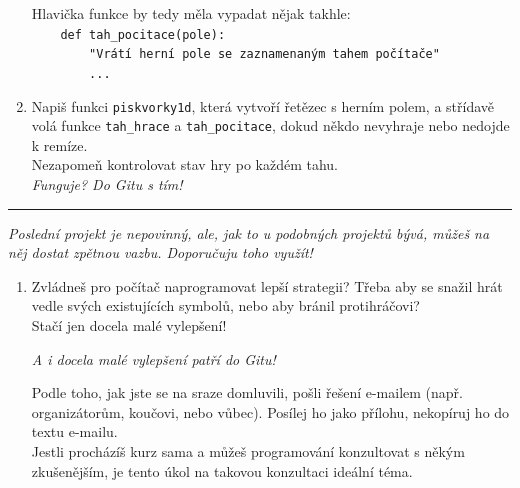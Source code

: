 \documentclass[a4paper,10pt]{article}
\newcommand\startsection[1]{
     \vspace{0.2ex}
    \hrule
    {\fontspec{Oxygen} \tiny
     \vspace{-1ex}
     \emph{#1}
     \vspace{-1.5em}
    }
}
\begin{document}
\begin{enumerate}[resume]
    Hlavička funkce by tedy měla vypadat nějak takhle:
\\\verb+    def tah_pocitace(pole):+
\\\verb+        "Vrátí herní pole se zaznamenaným tahem počítače"+
\\\verb+        ...+

\item Napiš funkci \texttt{piskvorky1d}, která vytvoří řetězec s herním polem,
    a střídavě volá funkce \texttt{tah\_hrace} a \texttt{tah\_pocitace},
    dokud někdo nevyhraje nebo nedojde k remíze.
    \\Nezapomeň kontrolovat stav hry po každém tahu.
    \\\emph{\small Funguje? Do Gitu s tím!}

\end{enumerate}

\startsection{Poslední projekt je nepovinný, ale, jak to u podobných projektů bývá, můžeš na něj dostat zpětnou vazbu. Doporučuju toho využít!}

\begin{enumerate}[resume]

\item Zvládneš pro počítač naprogramovat lepší strategii?
    Třeba aby se snažil hrát vedle svých existujících symbolů,
    nebo aby bránil protihráčovi?
    \\Stačí jen docela malé vylepšení!

    \emph{\small A i docela malé vylepšení patří do Gitu!}

    Podle toho, jak jste se na sraze domluvili, pošli řešení e-mailem
    (např. organizátorům, koučovi, nebo vůbec).
    Posílej ho jako přílohu, nekopíruj ho do textu e-mailu.
    \\Jestli procházíš kurz sama a můžeš programování konzultovat s někým
    zkušenějším, je tento úkol na takovou konzultaci ideální téma.

\end{enumerate}
\end{document}
